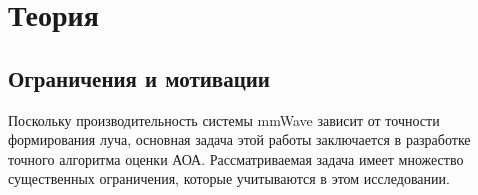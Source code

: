 




\section{Теория}
\subsection{Ограничения и мотивации}

Поскольку производительность системы mmWave зависит от точности формирования луча, основная задача
этой работы заключается в разработке точного алгоритма оценки АОА. Рассматриваемая задача имеет множество
существенных ограничения, которые учитываются в этом исследовании.

